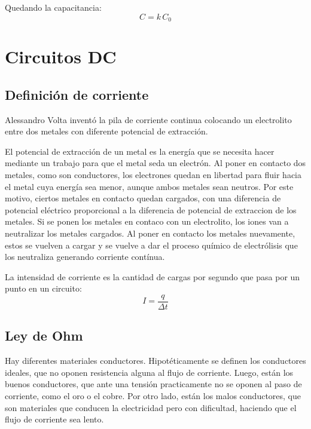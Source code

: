 \documentclass[a5paper,12pt,twoside]{book}
\begin{document}
Quedando la capacitancia:
\begin{equation*}
    C = k \, C_0
\end{equation*}


\chapter{Circuitos DC}


\section{Definición de corriente}

Alessandro Volta inventó la pila de corriente continua colocando un electrolito entre dos metales con diferente potencial de extracción.

El potencial de extracción de un metal es la energía que se necesita hacer mediante un trabajo para que el metal seda un electrón. Al poner en contacto dos metales, como son conductores, los electrones quedan en libertad para fluir hacia el metal cuya energía sea menor, aunque ambos metales sean neutros. Por este motivo, ciertos metales en contacto quedan cargados, con una diferencia de potencial eléctrico proporcional a la diferencia de potencial de extraccion de los metales. Si se ponen los metales en contaco con un electrolito, los iones van a neutralizar los metales cargados. Al poner en contacto los metales nuevamente, estos se vuelven a cargar y se vuelve a dar el proceso químico de electrólisis que los neutraliza generando corriente contínua.

La intensidad de corriente es la cantidad de cargas por segundo que pasa por un punto en un circuito:
\begin{equation*}
    I = \frac{q}{\Delta t}
\end{equation*}


\section{Ley de Ohm}

Hay diferentes materiales conductores. Hipotéticamente se definen los conductores ideales, que no oponen resistencia alguna al flujo de corriente. Luego, están los buenos conductores, que ante una tensión practicamente no se oponen al paso de corriente, como el oro o el cobre. Por otro lado, están los malos conductores, que son materiales que conducen la electricidad pero con dificultad, haciendo que el flujo de corriente sea lento.
\end{document}
